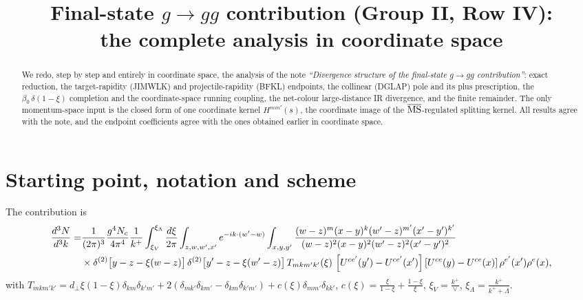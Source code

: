 \documentclass[10pt]{article}
\title{Final-state $g\to gg$ contribution (Group II, Row IV):\\
the complete analysis in coordinate space}
\author{}
\date{}
\begin{document}
\maketitle
\vspace{-2.5em}

\begin{abstract}
We redo, step by step and entirely in coordinate space, the analysis of the note
\emph{``Divergence structure of the final-state $g\to gg$ contribution''}: exact reduction, the
target-rapidity (JIMWLK) and projectile-rapidity (BFKL) endpoints, the collinear (DGLAP) pole and
its plus prescription, the $\beta_0\,\delta(1-\xi)$ completion and the coordinate-space running
coupling, the net-colour large-distance IR divergence, and the finite remainder. The only
momentum-space input is the closed form of one coordinate kernel $H^{mm'}(s)$, the
coordinate image of the $\overline{\rm MS}$-regulated splitting kernel. All results agree with
the note, and the endpoint coefficients agree with the ones obtained earlier in coordinate
space.
\end{abstract}

\section{Starting point, notation and scheme}
The contribution is
\begin{align}\label{eq:start}
\frac{d^{3}N}{d^{3}k}= &\frac{1}{(2\pi)^{3}}\frac{g^{4}N_{c}}{4\pi^{4}}\frac{1}{k^{+}}\int_{\xi_V}^{\xi_\Lambda}\frac{d\xi}{2\pi}\int_{z,w,w',x'}e^{-ik\cdot(w'-w)}\int_{x,y,y'}\frac{(w-z)^{m}(x-y)^{k}(w'-z)^{m'}(x'-y')^{k'}}{(w-z)^{2}(x-y)^{2}(w'-z)^{2}(x'-y')^{2}}\notag\\
&\times\delta^{(2)}\big[y-z-\xi(w-z)\big]\,\delta^{(2)}\big[y'-z-\xi(w'-z)\big]\,T_{mkm'k'}(\xi)\,
\left[U^{ce'}(y')-U^{ce'}(x')\right]\left[U^{ce}(y)-U^{ce}(x)\right]\rho^{e'}(x')\rho^{e}(x),
\end{align}
with $T_{mkm'k'}=d_\perp\xi(1-\xi)\delta_{km}\delta_{k'm'}+2(\delta_{mk'}\delta_{km'}-\delta_{km}\delta_{k'm'})+c(\xi)\delta_{mm'}\delta_{kk'}$,
$c(\xi)=\frac{\xi}{1-\xi}+\frac{1-\xi}{\xi}$, $\xi_V=\frac{k^{+}}{\vee}$,
$\xi_\Lambda=\frac{k^{+}}{k^{+}+\Lambda}$.
\end{document}
